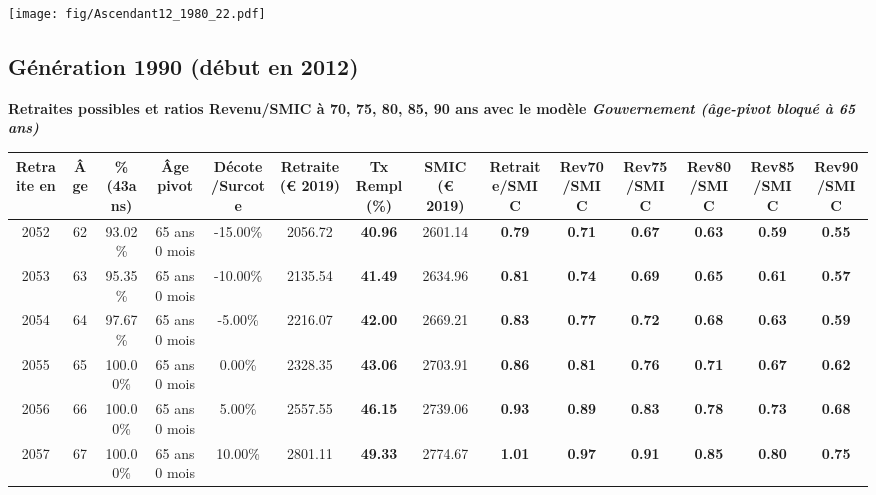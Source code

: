  \vspace{0.1cm} 

 \begin{center}\texttt{[image: fig/Ascendant12\_1980\_22.pdf]}\end{center} \label{fig/Ascendant12_1980_22.pdf} 

\newpage 
 
\subsection{Génération 1990 (début en 2012)} 

{\bf \noindent Retraites possibles et ratios Revenu/SMIC à 70, 75, 80, 85, 90 ans avec le modèle \emph{Gouvernement (âge-pivot bloqué à 65 ans)}}  
 
\begin{adjustbox}{max width=\textwidth} 
\begin{tabular}[htb]{|c|c||c|c|c||c|c||c||c|c|c|c|c|c|} 
\hline 
 Retraite en &  Âge &  \%(43ans) &  Âge pivot &  Décote/Surcote &  Retraite (\euro{} 2019) &  Tx Rempl(\%) &  SMIC (\euro{} 2019) &  Retraite/SMIC &  Rev70/SMIC &  Rev75/SMIC &  Rev80/SMIC &  Rev85/SMIC &  Rev90/SMIC \\ 
\hline \hline 
 2052 &  62 &  93.02\% &  65 ans 0 mois &  -15.00\% &  2056.72 &  {\bf 40.96} &  2601.14 &  {\bf {\color{red} 0.79}} &  {\bf {\color{red} 0.71}} &  {\bf {\color{red} 0.67}} &  {\bf {\color{red} 0.63}} &  {\bf {\color{red} 0.59}} &  {\bf {\color{red} 0.55}} \\ 
\hline 
 2053 &  63 &  95.35\% &  65 ans 0 mois &  -10.00\% &  2135.54 &  {\bf 41.49} &  2634.96 &  {\bf {\color{red} 0.81}} &  {\bf {\color{red} 0.74}} &  {\bf {\color{red} 0.69}} &  {\bf {\color{red} 0.65}} &  {\bf {\color{red} 0.61}} &  {\bf {\color{red} 0.57}} \\ 
\hline 
 2054 &  64 &  97.67\% &  65 ans 0 mois &  -5.00\% &  2216.07 &  {\bf 42.00} &  2669.21 &  {\bf {\color{red} 0.83}} &  {\bf {\color{red} 0.77}} &  {\bf {\color{red} 0.72}} &  {\bf {\color{red} 0.68}} &  {\bf {\color{red} 0.63}} &  {\bf {\color{red} 0.59}} \\ 
\hline 
 2055 &  65 &  100.00\% &  65 ans 0 mois &  0.00\% &  2328.35 &  {\bf 43.06} &  2703.91 &  {\bf {\color{red} 0.86}} &  {\bf {\color{red} 0.81}} &  {\bf {\color{red} 0.76}} &  {\bf {\color{red} 0.71}} &  {\bf {\color{red} 0.67}} &  {\bf {\color{red} 0.62}} \\ 
\hline 
 2056 &  66 &  100.00\% &  65 ans 0 mois &  5.00\% &  2557.55 &  {\bf 46.15} &  2739.06 &  {\bf {\color{red} 0.93}} &  {\bf {\color{red} 0.89}} &  {\bf {\color{red} 0.83}} &  {\bf {\color{red} 0.78}} &  {\bf {\color{red} 0.73}} &  {\bf {\color{red} 0.68}} \\ 
\hline 
 2057 &  67 &  100.00\% &  65 ans 0 mois &  10.00\% &  2801.11 &  {\bf 49.33} &  2774.67 &  {\bf 1.01} &  {\bf {\color{red} 0.97}} &  {\bf {\color{red} 0.91}} &  {\bf {\color{red} 0.85}} &  {\bf {\color{red} 0.80}} &  {\bf {\color{red} 0.75}} \\ 
\hline 
\hline 
\end{tabular} 
\end{adjustbox} 
 
